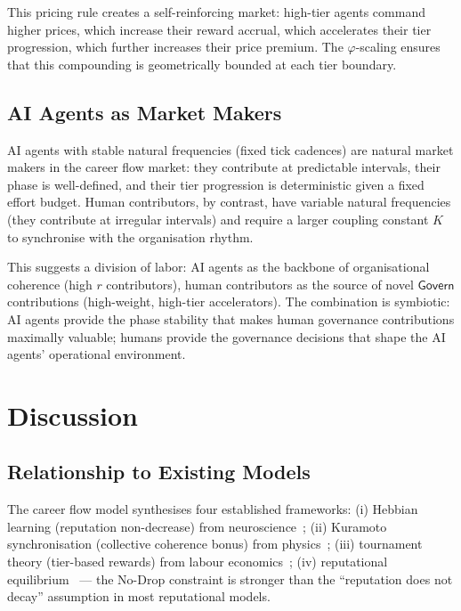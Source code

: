 \documentclass[12pt]{article}
\newcommand{\PHI}{\varphi}
\newcommand{\contrib}[1]{\mathsf{#1}}
\begin{document}
This pricing rule creates a self-reinforcing market: high-tier agents command
higher prices, which increase their reward accrual, which accelerates their tier
progression, which further increases their price premium.  The $\PHI$-scaling
ensures that this compounding is geometrically bounded at each tier boundary.

\subsection{AI Agents as Market Makers}

AI agents with stable natural frequencies (fixed tick cadences) are natural
market makers in the career flow market: they contribute at predictable
intervals, their phase is well-defined, and their tier progression is
deterministic given a fixed effort budget.  Human contributors, by contrast,
have variable natural frequencies (they contribute at irregular intervals) and
require a larger coupling constant $K$ to synchronise with the organisation
rhythm.

This suggests a division of labor: AI agents as the backbone of organisational
coherence (high $r$ contributors), human contributors as the source of novel
$\contrib{Govern}$ contributions (high-weight, high-tier accelerators).  The
combination is symbiotic: AI agents provide the phase stability that makes human
governance contributions maximally valuable; humans provide the governance
decisions that shape the AI agents' operational environment.

\section{Discussion}
\label{sec:discussion}

\subsection{Relationship to Existing Models}

The career flow model synthesises four established frameworks:
(i) Hebbian learning (reputation non-decrease) from neuroscience~\cite{hebb1949};
(ii) Kuramoto synchronisation (collective coherence bonus) from
physics~\cite{kuramoto1984};
(iii) tournament theory (tier-based rewards) from labour
economics~\cite{lazear1981};
(iv) reputational equilibrium~\cite{diamond1989} — the No-Drop constraint is
stronger than the ``reputation does not decay'' assumption in most reputational
models.
\end{document}

